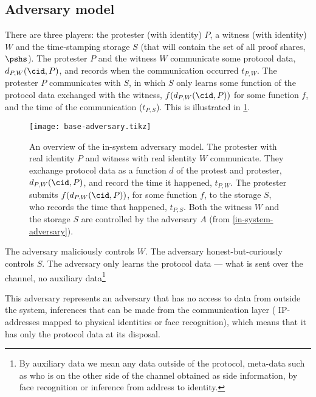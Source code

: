 \subsection{Adversary model}%
\label{formal-adversary-model}


There are three players: the protester (with identity) \(P\), a witness (with 
identity) \(W\) and the time-stamping storage \(S\) (that will contain the set 
of all proof shares, \(\pshs\)).
The protester \(P\) and the witness \(W\) communicate some protocol data,
\(d_{P,W}(\cid, P)\), and records when the communication occurred \(t_{P,W}\).
The protester \(P\) communicates with \(S\), in which \(S\) only learns some 
function of the protocol data exchanged with the witness, \(f(d_{P,W}(\cid, 
  P))\) for some function \(f\), and the time of the communication 
(\(t_{P,S}\)).
This is illustrated in \cref{fig:base-adversary}.

\begin{figure}
  \centering
  \texttt{[image: base-adversary.tikz]}
  \caption{\label{fig:base-adversary}%
    An overview of the in-system adversary model.
    The protester with real identity \(P\) and witness with real identity \(W\) 
    communicate.
    They exchange protocol data as a function \(d\) of the protest and protester, \(d_{P,W}(\cid, P)\), and record the time it 
    happened, \(t_{P,W}\).
    The protester submits \(f(d_{P,W}(\cid, P))\), for some function \(f\), to 
    the storage \(S\), who records the time that happened, \(t_{P,S}\).
    Both the witness \(W\) and the storage \(S\) are controlled by the adversary 
    \(A\) (from \cref{in-system-adversary}).
  }
\end{figure}

The adversary maliciously controls \(W\).
The adversary honest-but-curiously controls \(S\).
The adversary only learns the protocol data --- \ie what is sent over the 
channel, no auxiliary data\footnote{%
  By auxiliary data we mean any data outside of the protocol, \ie
  meta-data such as who is on the other side of the channel obtained
  as side information, \eg by face recognition or inference from address
  to identity.
}

This adversary represents an adversary that has no access to data from outside 
the system, \eg inferences that can be made from the communication layer (\eg 
IP-addresses mapped to physical identities or face recognition), which means 
that it has only the protocol data at its disposal.


